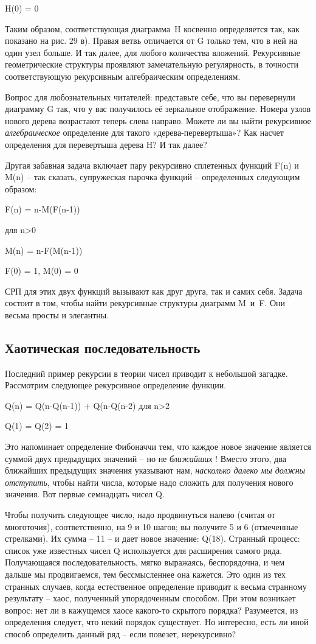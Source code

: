 \documentclass[../main.tex]{subfiles}
\begin{document}
H(0) = 0

Таким образом, соответствующая диаграмма~H косвенно определяется так, как показано на рис. 29 в). Правая ветвь отличается от G только тем, что в ней на один узел больше. И так далее, для любого количества вложений. Рекурсивные геометрические структуры проявляют замечательную регулярность, в точности соответствующую рекурсивным алгебраическим определениям.

Вопрос для любознательных читателей: представьте себе, что вы перевернули диаграмму G так, что у вас получилось её зеркальное отображение. Номера узлов нового дерева возрастают теперь слева направо. Можете ли вы найти рекурсивное \emph{алгебраическое} определение для такого «дерева-перевертыша»? Как насчет определения для перевертыша дерева H? И так далее?

Другая забавная задача включает пару рекурсивно сплетенных функций F(n) и M(n) \--- так сказать, супружеская парочка функций \--- определенных следующим образом:

F(n) = n-M(F(n-1))

для n\textgreater0

M(n) = n-F(M(n-1))

F(0) = 1, M(0) = 0

СРП для этих двух функций вызывают как друг друга, так и самих себя. Задача состоит в том, чтобы найти рекурсивные структуры диаграмм M~и~F\@. Они весьма просты и элегантны.


\subsection{Хаотическая последовательность}

Последний пример рекурсии в теории чисел приводит к небольшой загадке. Рассмотрим следующее рекурсивное определение функции.

Q(n) = Q(n-Q(n-1)) + Q(n-Q(n-2) для n\textgreater2

Q(1) = Q(2) = 1

Это напоминает определение Фибоначчи тем, что каждое новое значение является суммой двух предыдущих значений \--- но не \emph{ближайших} ! Вместо этого, два ближайших предыдущих значения указывают нам, \emph{насколько далеко мы должны отступить}, чтобы найти числа, которые надо сложить для получения нового значения. Вот первые семнадцать чисел Q.

Чтобы получить следующее число, надо продвинуться налево (считая от многоточия), соответственно, на 9 и 10 шагов; вы получите 5 и 6 (отмеченные стрелками). Их сумма \--- 11 \--- и дает новое значение: Q(18). Странный процесс: список уже известных чисел Q используется для расширения самого ряда. Получающаяся последовательность, мягко выражаясь, беспорядочна, и чем дальше мы продвигаемся, тем бессмысленнее она кажется. Это один из тех странных случаев, когда естественное определение приводит к весьма странному результату \--- хаос, полученный упорядоченным способом. При этом возникает вопрос: нет ли в кажущемся хаосе какого-то скрытого порядка? Разумеется, из определения следует, что некий порядок существует. Но интересно, есть ли иной способ определить данный ряд \--- если повезет, нерекурсивно?
\end{document}
